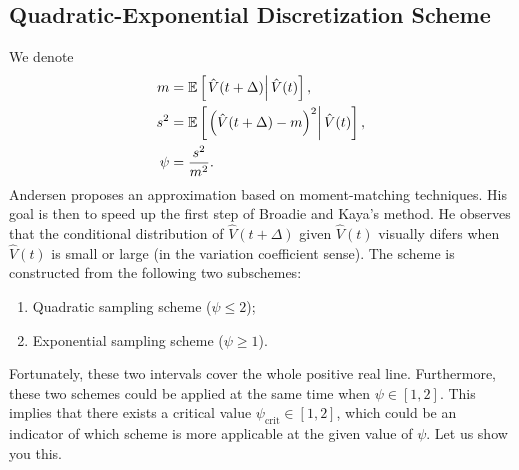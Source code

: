         \subsection{Quadratic-Exponential Discretization Scheme}
            We denote 
            \begin{align}
                m    &= \mathbb{E}\left[\left.\hat{V}(t+\Delta)\right| \hat{V}(t)\right], \label{Andersen:mean}\\
                s^2  &= \mathbb{E}\left[\left.\left(\hat{V}(t+\Delta) - m\right)^2\right| \hat{V}(t)\right], \\
                \psi &= \frac{s^2}{m^2}.\label{Andersen:CV}
            \end{align}
            Andersen proposes an approximation based on moment-matching techniques. His goal is then to speed up the first step of Broadie and Kaya's method.
            He observes that the conditional distribution of $\hat{V}(t+\Delta)$ given $\hat{V}(t)$ visually difers when $\hat{V}(t)$ is small or large (in the variation coefficient sense).
            The scheme is constructed from the following two subschemes:
            \begin{enumerate}
                \item Quadratic sampling scheme ($\psi \leq 2$);
                \item Exponential sampling scheme ($\psi \geq 1$).
            \end{enumerate}
            Fortunately, these two intervals cover the whole positive real line. Furthermore, these two schemes could be applied at the same time when $\psi\in[1, 2]$. This implies that there exists a critical value $\psi_{\text{crit}}\in[1, 2]$, which could be an indicator of which scheme is more applicable at the given value of $\psi$. Let us show you this.
